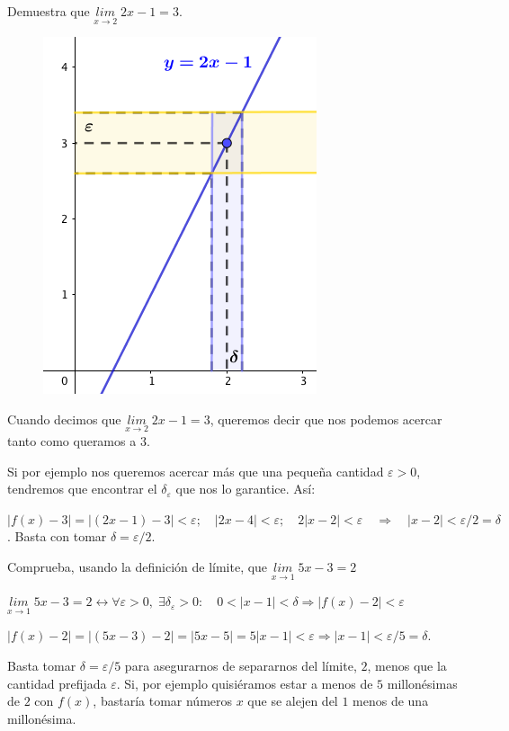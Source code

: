 		
		\begin{ejem} Demuestra que $\underset {x\to 2}{lim}\;{2x-1}=3$.
		
		\begin{multicols}{2}
			\begin{figure}[H]
			\centering
			\includegraphics[width=0.2
			\textwidth]{imagenes/imagenes03/T03IM08.png}
		\end{figure}
		
		Cuando decimos que $\underset {x\to 2}{lim}\;{2x-1}=3$, queremos decir que nos podemos acercar tanto como queramos a $3$. 
		
		Si por ejemplo nos queremos acercar más que una pequeña cantidad $\varepsilon>0$, tendremos que encontrar el $\delta_{\varepsilon}$ que nos lo garantice. Así:
		\end{multicols}
		
		$|f(x)-3|=|(2x-1)-3|<\varepsilon; \quad |2x-4|<\varepsilon; \quad 2|x-2|<\varepsilon \quad \Rightarrow \quad |x-2|<\varepsilon/2=\delta$. Basta con tomar $\delta=\varepsilon/2$.
			
		

		\end{ejem}
		
		
		\begin{ejem} Comprueba, usando la definición de límite, que $\underset {x\to 1}{lim}\;{5x-3}=2$
		
			 $\underset {x\to 1}{lim}\;{5x-3}=2 \longleftrightarrow  \forall \varepsilon>0,\; \exists \delta_{\varepsilon}>0:\quad 0<|x-1|<\delta \Rightarrow |f(x)-2|<\varepsilon$
			
			$|f(x)-2|=|(5x-3)-2|=|5x-5|=5|x-1|<\varepsilon \Rightarrow |x-1|<\varepsilon/5=\delta$. 
			
			Basta tomar $\delta=\varepsilon/5$ para asegurarnos de separarnos del límite, $2$, menos que la cantidad prefijada $\varepsilon$. Si, por ejemplo quisiéramos estar a menos de $5$ millonésimas de $2$ con $f(x)$, bastaría tomar números $x$ que se alejen del $1$ menos de una millonésima.
		\end{ejem}
		
